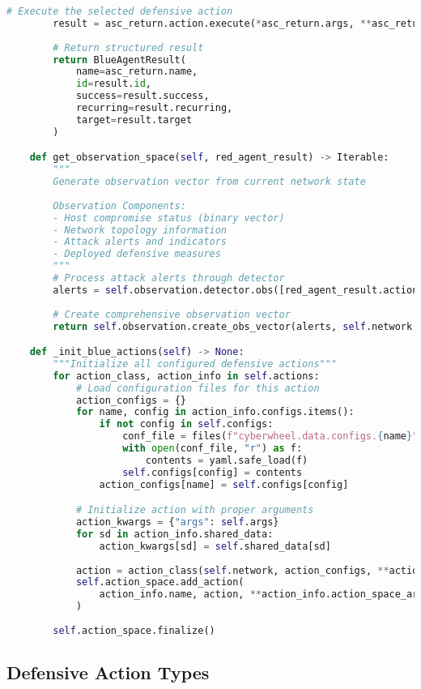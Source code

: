 \documentclass[12pt,a4paper]{article}
\begin{document}
\begin{lstlisting}[language=Python, caption=RL Blue Agent Implementation]
        # Execute the selected defensive action
        result = asc_return.action.execute(*asc_return.args, **asc_return.kwargs)
        
        # Return structured result
        return BlueAgentResult(
            name=asc_return.name,
            id=result.id, 
            success=result.success, 
            recurring=result.recurring,
            target=result.target
        )

    def get_observation_space(self, red_agent_result) -> Iterable:
        """
        Generate observation vector from current network state
        
        Observation Components:
        - Host compromise status (binary vector)
        - Network topology information  
        - Attack alerts and indicators
        - Deployed defensive measures
        """
        # Process attack alerts through detector
        alerts = self.observation.detector.obs([red_agent_result.action_results.detector_alert])
        
        # Create comprehensive observation vector
        return self.observation.create_obs_vector(alerts, self.network.get_num_decoys())

    def _init_blue_actions(self) -> None:
        """Initialize all configured defensive actions"""
        for action_class, action_info in self.actions:
            # Load configuration files for this action
            action_configs = {}
            for name, config in action_info.configs.items():
                if not config in self.configs:
                    conf_file = files(f"cyberwheel.data.configs.{name}").joinpath(config)
                    with open(conf_file, "r") as f:
                        contents = yaml.safe_load(f)
                    self.configs[config] = contents
                action_configs[name] = self.configs[config]

            # Initialize action with proper arguments
            action_kwargs = {"args": self.args}
            for sd in action_info.shared_data:
                action_kwargs[sd] = self.shared_data[sd]
            
            action = action_class(self.network, action_configs, **action_kwargs)
            self.action_space.add_action(
                action_info.name, action, **action_info.action_space_args
            )
        
        self.action_space.finalize()
\end{lstlisting}

\subsection{Defensive Action Types}
\end{document}
